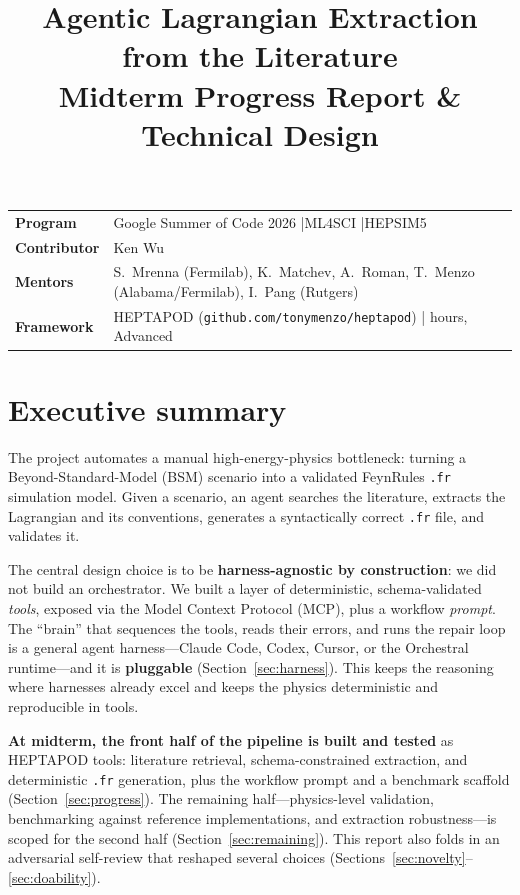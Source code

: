 \documentclass[11pt]{article}
\title{\vspace{-1.2cm}\textbf{\LARGE Agentic Lagrangian Extraction from the Literature}\\[4pt]
\large Midterm Progress Report \& Technical Design}
\author{}
\date{}
\newcommand{\code}[1]{\texttt{#1}}
\begin{document}
\maketitle
\vspace{-2.1cm}

\begin{center}
\begin{tabularx}{\textwidth}{@{}lX@{}}
\textbf{Program} & Google Summer of Code 2026 \quad|\quad ML4SCI \quad|\quad HEPSIM5 \\
\textbf{Contributor} & Ken Wu \\
\textbf{Mentors} & S.~Mrenna (Fermilab), K.~Matchev, A.~Roman, T.~Menzo (Alabama/Fermilab), I.~Pang (Rutgers) \\
\textbf{Framework} & HEPTAPOD (\code{github.com/tonymenzo/heptapod}) \quad|\quad 350 hours, Advanced \\
\end{tabularx}
\end{center}

\hrulefill

\section{Executive summary}

The project automates a manual high-energy-physics bottleneck: turning a
Beyond-Standard-Model (BSM) scenario into a validated FeynRules \code{.fr}
simulation model. Given a scenario, an agent searches the literature, extracts
the Lagrangian and its conventions, generates a syntactically correct \code{.fr}
file, and validates it.

The central design choice is to be \textbf{harness-agnostic by construction}: we
did not build an orchestrator. We built a layer of deterministic,
schema-validated \emph{tools}, exposed via the Model Context Protocol (MCP), plus
a workflow \emph{prompt}. The ``brain'' that sequences the tools, reads their
errors, and runs the repair loop is a general agent harness---Claude Code,
Codex, Cursor, or the Orchestral runtime---and it is \textbf{pluggable}
(Section~\ref{sec:harness}). This keeps the reasoning where harnesses already
excel and keeps the physics deterministic and reproducible in tools.

\textbf{At midterm, the front half of the pipeline is built and tested} as
HEPTAPOD tools: literature retrieval, schema-constrained extraction, and
deterministic \code{.fr} generation, plus the workflow prompt and a benchmark
scaffold (Section~\ref{sec:progress}). The remaining half---physics-level
validation, benchmarking against reference implementations, and extraction
robustness---is scoped for the second half (Section~\ref{sec:remaining}). This
report also folds in an adversarial self-review that reshaped several choices
(Sections~\ref{sec:novelty}--\ref{sec:doability}).
\end{document}
